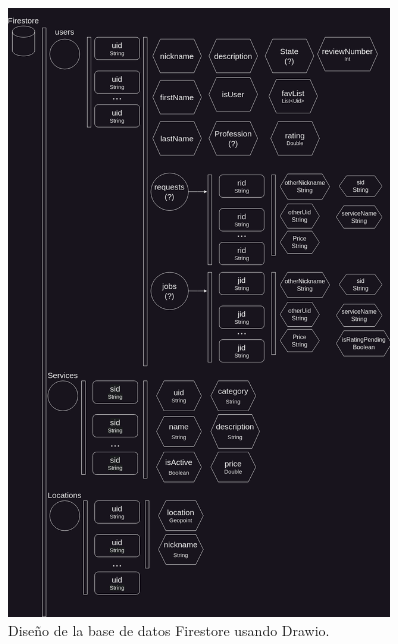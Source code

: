 \begin{figure}[ht]
	\centering
	\includegraphics[width = 0.9\textwidth]{Imagenes/drawio/firestore_db.png}
	\caption{Diseño de la base de datos Firestore usando Drawio.}
	\label{fig:firestore_db}
\end{figure}